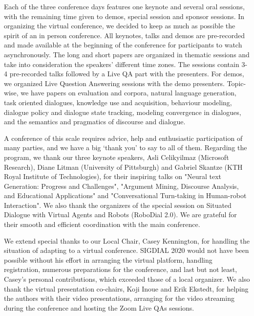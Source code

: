 \documentclass[11pt]{article}
\begin{document}
Each of the three conference days features one keynote and several oral sessions, with the remaining time given to demos, special session and sponsor sessions. In organizing the virtual conference, we decided to keep as much as possible the spirit of an in person conference. All keynotes, talks and demos are pre-recorded and made available at the beginning of the conference for participants to watch asynchronously. The long and short papers are organized in thematic sessions and take into consideration the speakers' different time zones.  The sessions contain 3-4 pre-recorded talks followed by a Live QA part with the presenters. For demos, we organized Live Question Answering sessions with the demo presenters. Topic-wise, we have papers on evaluation and corpora, natural language generation, task oriented dialogues, knowledge use and acquisition,  behaviour modeling, dialogue policy and dialogue state tracking, modeling convergence in dialogues, and the semantics and pragmatics of discourse and dialogue. 

A conference of this scale requires advice, help and enthusiastic participation of many parties, and we have a big `thank you' to say to all of them. Regarding the program, we thank our three keynote speakers, Asli Celikyilmaz (Microsoft Research), Diane Litman (University of Pittsburgh) and Gabriel Skantze (KTH Royal Institute of Technologies),   for their inspiring talks on "Neural text Generation: Progress and Challenges", "Argument Mining, Discourse Analysis, and Educational Applications" and "Conversational Turn-taking in Human-robot Interaction". 
We also thank the organizers of the special session on Situated Dialogue with Virtual Agents and Robots (RoboDial 2.0). We are grateful for their smooth and efficient coordination with the main conference.

We extend special thanks to our Local Chair, Casey Kennington, for handling the  situation of adapting to a virtual conference. SIGDIAL 2020 would not have been possible without his effort in arranging the virtual platform, handling registration, numerous preparations for the conference, and last but not least, Casey's personal contributions, which exceeded those of a local organizer. We also thank the virtual presentation co-chairs, Koji Inoue and Erik Ekstedt, for helping the authors with their video presentations, arranging for the video streaming during the conference and hosting the Zoom Live QAs sessions. 
\end{document}
